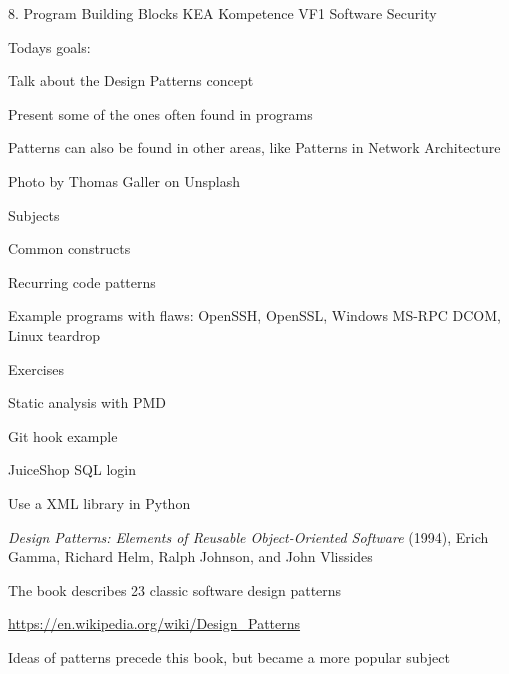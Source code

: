 \documentclass[Screen16to9,17pt]{foils}
\begin{document}
\mytitlepage
{8. Program Building Blocks}
{KEA Kompetence VF1 Software Security}




Todays goals:
\begin{list2}
\item Talk about the Design Patterns concept
\item Present some of the ones often found in programs
\item Patterns can also be found in other areas, like Patterns in Network Architecture
\end{list2}

  Photo by Thomas Galler on Unsplash


\begin{list1}
\item Subjects
\begin{list2}
\item Common constructs
\item Recurring code patterns
\item Example programs with flaws: OpenSSH, OpenSSL, Windows MS-RPC DCOM, Linux teardrop
\end{list2}
\item Exercises
\begin{list2}
\item Static analysis with PMD
\item Git hook example
\item JuiceShop SQL login
\item Use a XML library in Python
\end{list2}
\end{list1}


\begin{list1}
\item 
\end{list1}




\begin{list2}
\item \emph{Design Patterns: Elements of Reusable Object-Oriented Software} (1994), Erich Gamma, Richard Helm, Ralph Johnson, and John Vlissides

\item The book describes 23 classic software design patterns

\item \url{https://en.wikipedia.org/wiki/Design_Patterns}

\item Ideas of patterns precede this book, but became a more popular subject
\end{list2}
\end{document}

